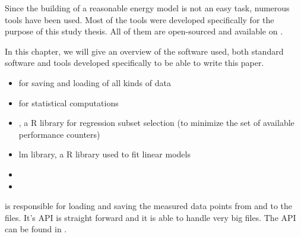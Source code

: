 \label{sec:datapoint-files}

\label{sec:counter-files}


Since the building of a reasonable energy model is not an easy task, numerous
tools have been used. Most of the tools were developed specifically for the
purpose of this study thesis. All of them are open-sourced and available on
.

In this chapter, we will give an overview of the software used, both standard
software and tools developed specifically to be able to write this paper.


\begin{itemize}

\item \JWTprotobuf for saving and loading of all kinds of data

\item {} for statistical computations

\item {}
      , a R library for regression subset selection (to minimize the set of
      available performance counters)

\item {}
      {lm library}, a R library used to fit linear models

\item {}

\item {}

\end{itemize}




\JWlfour{\JWTlibdp}

\JWTlibdp is responsible for loading and saving the measured data points from
and to the \JWTprotobuf files. It's API is straight forward and it is able to
handle very big files. The API can be found in
.


